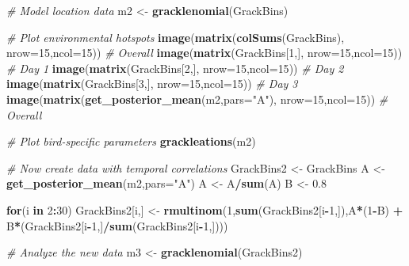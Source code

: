 \documentclass[]{article}
\newenvironment{Shaded}{\begin{snugshade}}{\end{snugshade}}
\newcommand{\KeywordTok}[1]{\textcolor[rgb]{0.13,0.29,0.53}{\textbf{#1}}}
\newcommand{\DataTypeTok}[1]{\textcolor[rgb]{0.13,0.29,0.53}{#1}}
\newcommand{\DecValTok}[1]{\textcolor[rgb]{0.00,0.00,0.81}{#1}}
\newcommand{\FloatTok}[1]{\textcolor[rgb]{0.00,0.00,0.81}{#1}}
\newcommand{\StringTok}[1]{\textcolor[rgb]{0.31,0.60,0.02}{#1}}
\newcommand{\CommentTok}[1]{\textcolor[rgb]{0.56,0.35,0.01}{\textit{#1}}}
\newcommand{\ControlFlowTok}[1]{\textcolor[rgb]{0.13,0.29,0.53}{\textbf{#1}}}
\newcommand{\OperatorTok}[1]{\textcolor[rgb]{0.81,0.36,0.00}{\textbf{#1}}}
\newcommand{\NormalTok}[1]{#1}
\begin{document}
\begin{Shaded}
\begin{Highlighting}[]
\CommentTok{# Model location data}
\NormalTok{m2 <-}\StringTok{ }\KeywordTok{gracklenomial}\NormalTok{(GrackBins)}
 
\CommentTok{# Plot environmental hotspots}
\KeywordTok{image}\NormalTok{(}\KeywordTok{matrix}\NormalTok{(}\KeywordTok{colSums}\NormalTok{(GrackBins), }\DataTypeTok{nrow=}\DecValTok{15}\NormalTok{,}\DataTypeTok{ncol=}\DecValTok{15}\NormalTok{)) }\CommentTok{# Overall}
\KeywordTok{image}\NormalTok{(}\KeywordTok{matrix}\NormalTok{(GrackBins[}\DecValTok{1}\NormalTok{,], }\DataTypeTok{nrow=}\DecValTok{15}\NormalTok{,}\DataTypeTok{ncol=}\DecValTok{15}\NormalTok{)) }\CommentTok{# Day 1}
\KeywordTok{image}\NormalTok{(}\KeywordTok{matrix}\NormalTok{(GrackBins[}\DecValTok{2}\NormalTok{,], }\DataTypeTok{nrow=}\DecValTok{15}\NormalTok{,}\DataTypeTok{ncol=}\DecValTok{15}\NormalTok{)) }\CommentTok{# Day 2}
\KeywordTok{image}\NormalTok{(}\KeywordTok{matrix}\NormalTok{(GrackBins[}\DecValTok{3}\NormalTok{,], }\DataTypeTok{nrow=}\DecValTok{15}\NormalTok{,}\DataTypeTok{ncol=}\DecValTok{15}\NormalTok{)) }\CommentTok{# Day 3}
\KeywordTok{image}\NormalTok{(}\KeywordTok{matrix}\NormalTok{(}\KeywordTok{get_posterior_mean}\NormalTok{(m2,}\DataTypeTok{pars=}\StringTok{"A"}\NormalTok{), }\DataTypeTok{nrow=}\DecValTok{15}\NormalTok{,}\DataTypeTok{ncol=}\DecValTok{15}\NormalTok{)) }\CommentTok{# Overall}

\CommentTok{# Plot bird-specific parameters}
\KeywordTok{grackleations}\NormalTok{(m2)}

\CommentTok{# Now create data with temporal correlations}
\NormalTok{GrackBins2 <-}\StringTok{ }\NormalTok{GrackBins}
\NormalTok{A <-}\StringTok{ }\KeywordTok{get_posterior_mean}\NormalTok{(m2,}\DataTypeTok{pars=}\StringTok{"A"}\NormalTok{)}
\NormalTok{A <-}\StringTok{ }\NormalTok{A}\OperatorTok{/}\KeywordTok{sum}\NormalTok{(A)}
\NormalTok{B <-}\StringTok{ }\FloatTok{0.8}

\ControlFlowTok{for}\NormalTok{(i }\ControlFlowTok{in} \DecValTok{2}\OperatorTok{:}\DecValTok{30}\NormalTok{)}
\NormalTok{GrackBins2[i,] <-}\StringTok{ }\KeywordTok{rmultinom}\NormalTok{(}\DecValTok{1}\NormalTok{,}\KeywordTok{sum}\NormalTok{(GrackBins2[i}\OperatorTok{-}\DecValTok{1}\NormalTok{,]),A}\OperatorTok{*}\NormalTok{(}\DecValTok{1}\OperatorTok{-}\NormalTok{B) }\OperatorTok{+}\StringTok{ }\NormalTok{B}\OperatorTok{*}\NormalTok{(GrackBins2[i}\OperatorTok{-}\DecValTok{1}\NormalTok{,]}\OperatorTok{/}\KeywordTok{sum}\NormalTok{(GrackBins2[i}\OperatorTok{-}\DecValTok{1}\NormalTok{,])))}

\CommentTok{# Analyze the new data}
\NormalTok{m3 <-}\StringTok{ }\KeywordTok{gracklenomial}\NormalTok{(GrackBins2)}


\end{Highlighting}
\end{Shaded}
\end{document}
